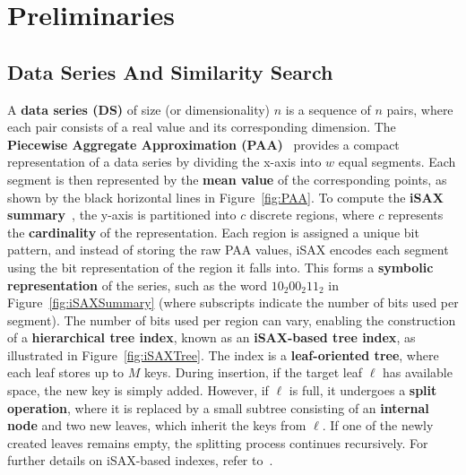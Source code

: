 \chapter{Preliminaries}
\label{chapter:prelemenaries}

\section{Data Series And Similarity Search}

A \textbf{data series (DS)} of size (or dimensionality) \( n \) is a sequence 
of \( n \) pairs, where each pair consists of a real value and its corresponding 
dimension.
% 
The \textbf{Piecewise Aggregate Approximation (PAA)}~\cite{DBLP:journals/kais/KeoghCPM01} 
provides a compact representation of a data series by dividing the x-axis into 
\( w \) equal segments. Each segment is then represented by the \textbf{mean value} 
of the corresponding points, as shown by the black horizontal lines in 
Figure~\ref{fig:PAA}. 
% 
% 
To compute the \textbf{iSAX summary}~\cite{shieh2008sax}, the y-axis is partitioned 
into \( c \) discrete regions, where \( c \) represents the \textbf{cardinality} 
of the representation.
%
Each region is assigned a unique bit pattern, and instead of storing the raw PAA values, 
iSAX encodes each segment using the bit representation of the region it falls into. 
This forms a \textbf{symbolic representation} of the series, 
such as the word \( 10_2 00_2 11_2 \) in Figure~\ref{fig:iSAXSummary} 
(where subscripts indicate the number of bits used per segment).
% 
The number of bits used per region can vary, enabling the construction of a 
\textbf{hierarchical tree index}, known as an \textbf{iSAX-based tree index}, as 
illustrated in Figure~\ref{fig:iSAXTree}.
The index is a \textbf{leaf-oriented tree}, where each leaf stores up to \( M \) keys.
% 
During insertion, if the target leaf \( \ell \) has available space, the new key 
is simply added. However, if \( \ell \) is full, it undergoes a \textbf{split operation},
where it is replaced by a small subtree consisting of an \textbf{internal node} and two 
new leaves, which inherit  the keys from \( \ell \). If one of the newly created leaves
remains empty, the splitting process continues recursively.
For further details on iSAX-based indexes, refer to~\cite{isaxfamily}.


